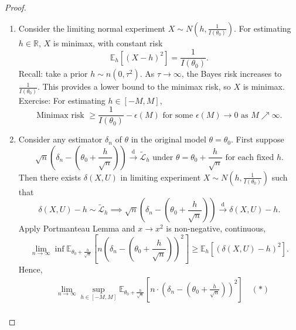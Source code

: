 \documentclass[a4paper]{article}
\begin{document}
\begin{proof}
	\quad
	\begin{enumerate}[leftmargin=*]
		\item Consider the limiting normal experiment $X \sim N(h,\frac{1}{I(\theta_0)})$. For estimating $h \in \mathbb{R}$, $X$ is minimax, with constant risk
		\begin{equation*}
			\mathbb{E}_h \left[(X-h)^2\right] = \frac{1}{I(\theta_0)}.
		\end{equation*}
		Recall: take a prior $h \sim n(0,\tau^2)$. As $\tau \to \infty$, the Bayes risk increases to $\frac{1}{I(\theta_0)}$. This provides a lower bound to the minimax risk, so $X$ is minimax. \\
		\newline
		Exercise: For estimating $h \in [-M,M]$,
		\begin{equation*}
			\text{Minimax risk } \geq \frac{1}{I(\theta_0)} - \epsilon(M) \text{ for some } \epsilon(M) \to 0 \text{ as } M \nearrow \infty. 
		\end{equation*}
		\item Consider any estimator $\delta_n$ of $\theta$ in the original model $\theta = \theta_0$. First suppose
		\begin{equation*}
			\sqrt{n} \left(\delta_n - \left(\theta_0 + \frac{h}{\sqrt{n}}\right)\right) \stackrel{\text{d}}{\longrightarrow} \tilde{\mathcal{L}}_h \text{ under $\theta = \theta_0 + \frac{h}{\sqrt{n}}$ for each fixed $h$.}
		\end{equation*}
		Then there exists $\delta(X,U)$ in limiting experiment $X \sim N\left(h,\frac{1}{I(\theta_0)}\right)$ such that
		\begin{equation*}
			\delta(X,U) - h \sim \tilde{\mathcal{L}}_h \implies \sqrt{n} \left(\delta_n - \left(\theta_0 + \frac{h}{\sqrt{n}}\right)\right) \stackrel{\text{d}}{\longrightarrow} \delta(X,U) - h.
		\end{equation*}
		Apply Portmanteau Lemma and $x \to x^2$ is non-negative, continuous,
		\begin{equation*}
			\lim\limits_{n \to \infty} \inf \mathbb{E}_{\theta_0 + \frac{h}{\sqrt{n}}} \left[n \left(\delta_n - \left(\theta_0 + \frac{h}{\sqrt{n}}\right)\right)^2\right] \geq \mathbb{E}_h \left[(\delta(X,U)-h)^2\right].
		\end{equation*}
		Hence,
		\begin{equation*}
			\begin{aligned}
				& \lim\limits_{n \to \infty} \sup\limits_{h \in [-M,M]} \mathbb{E}_{\theta_0+\frac{h}{\sqrt{n}}} \left[n \cdot \left(\delta_n - \left(\theta_0 + \frac{h}{\sqrt{n}}\right)\right)^2\right] \quad (\ast) \\

\end{aligned}
\end{equation*}
\end{enumerate}
\end{proof}
\end{document}

